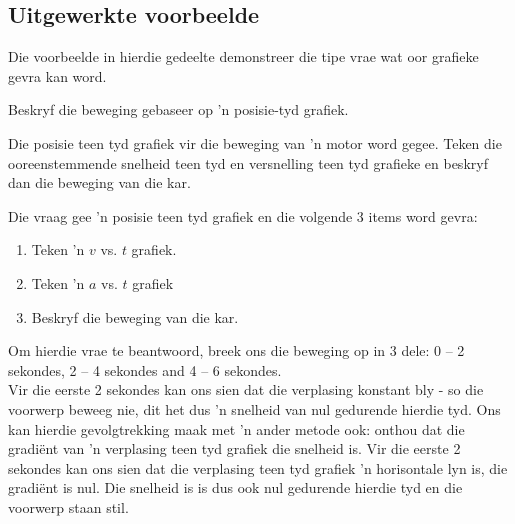 \subsection*{Uitgewerkte voorbeelde}
            \nopagebreak
Die voorbeelde in hierdie gedeelte demonstreer die tipe vrae wat oor grafieke gevra kan word. 
\clearpage
\begin{wex}{Beskryf die beweging gebaseer op 'n posisie-tyd grafiek.}{Die posisie teen tyd grafiek vir die beweging van 'n motor word gegee. Teken die ooreenstemmende snelheid teen tyd en versnelling teen tyd grafieke en beskryf dan die beweging van die kar.
\begin{center}
\end{center}
}{%
Die vraag gee 'n posisie teen tyd grafiek en die volgende 3 items word gevra:
\begin{enumerate}[label=\textbf{\arabic*}.]
\item Teken 'n $v$ vs. $t$ grafiek.
\item Teken 'n $a$ vs. $t$ grafiek
\item Beskryf die beweging van die kar.
\end{enumerate}
Om hierdie vrae te beantwoord, breek ons die beweging op in 3 dele: 0 -- 2 sekondes, 2 -- 4 sekondes and 4 -- 6 sekondes.\\

Vir die eerste 2 sekondes kan ons sien dat die verplasing konstant bly - so die voorwerp beweeg nie, dit het dus 'n snelheid van nul gedurende hierdie tyd. Ons kan hierdie gevolgtrekking maak met 'n ander metode ook: onthou dat die gradi\"ent van 'n verplasing teen tyd grafiek die snelheid is. Vir die eerste 2 sekondes kan ons sien dat die verplasing teen tyd grafiek 'n horisontale lyn is, die gradi\"ent is nul. Die snelheid is is dus ook nul gedurende hierdie tyd en die voorwerp staan stil. \\

}
\end{wex}
